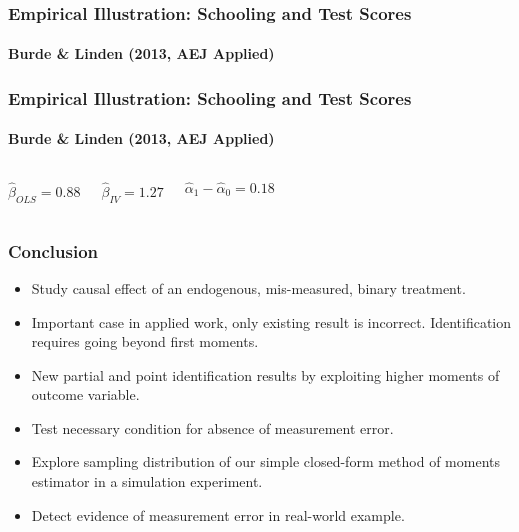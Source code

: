 \documentclass{beamer}
\begin{document}
\begin{frame}
  \frametitle{Empirical Illustration: Schooling and Test Scores}
\framesubtitle{Burde \& Linden (2013, AEJ Applied)}
\begin{figure}[h]
  \scriptsize
  \begingroup
  \centering
  
  \endgroup
\end{figure}
\end{frame}
\begin{frame}
  \frametitle{Empirical Illustration: Schooling and Test Scores}
\framesubtitle{Burde \& Linden (2013, AEJ Applied)}
    \begin{columns}[c]
    $\widehat{\beta}_{OLS} = 0.88$

    $\widehat{\beta}_{IV} = 1.27$

    $\widehat{\alpha}_1 - \widehat{\alpha}_0 = 0.18$
        \begin{figure}[h]
          \scriptsize
          \begingroup
          \centering
          
          \endgroup
        \end{figure}
    \end{columns}
\end{frame}
\begin{frame}
  \frametitle{Conclusion}
  \begin{itemize}
    \item Study causal effect of an endogenous, mis-measured, binary treatment.
    \item Important case in applied work, only existing result is incorrect. Identification requires going beyond first moments.
    \item New partial and point identification results by exploiting higher moments of outcome variable.
    \item Test necessary condition for absence of measurement error.
    \item Explore sampling distribution of our simple closed-form method of moments estimator in a simulation experiment.
    \item Detect evidence of measurement error in real-world example. 
  \end{itemize}
\end{frame}
\end{document}
